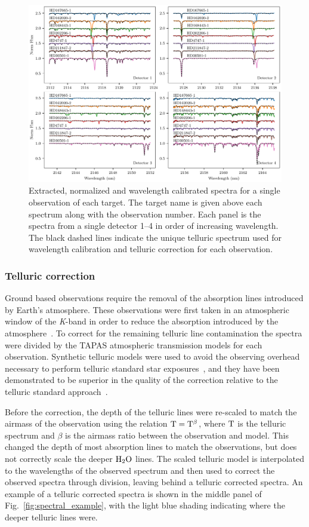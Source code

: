 \documentclass[fleqn,usenatbib]{mnras}
\begin{document}
\begin{figure}
    \includegraphics[width=0.8\hsize]{images/fig2.pdf}
    \caption{Extracted, normalized and wavelength calibrated spectra for a single observation of each target. The target name is given above each spectrum along with the observation number. Each panel is the spectra from a single detector 1--4 in order of increasing wavelength. The black dashed lines indicate the unique telluric spectrum used for wavelength calibration and telluric correction for each observation.}
    \label{fig:detector4allspectra}
\end{figure}

\subsubsection{Telluric correction}
\label{subsec:telluric_correction}
Ground based observations require the removal of the absorption lines introduced by Earth's atmosphere. These observations were first taken in an atmospheric window of the \textit{K}-band in order to reduce the absorption introduced by the atmosphere~\citep{barnes_hd_2008}. To correct for the remaining telluric line contamination the spectra were divided by the TAPAS\citep{bertaux_tapas_2014} atmospheric transmission models for each observation. Synthetic telluric models were used to avoid the observing overhead necessary to perform telluric standard star exposures~\citep{vacca_method_2003}, and they have been demonstrated to be superior in the quality of the correction relative to the telluric standard approach~\citep[e.g.][]{cotton_atmospheric_2014}.

Before the correction, the depth of the telluric lines were re-scaled to match the airmass of the observation using the relation \(\rm T = T^{\beta}\), where \(\rm T\) is the telluric spectrum and \(\beta\) is the airmass ratio between the observation and model. This changed the depth of most absorption lines to match the observations, but does not correctly scale the deeper \(\rm H_{2}O\) lines. The scaled telluric model is interpolated to the wavelengths of the observed spectrum and then used to correct the observed spectra through division, leaving behind a telluric corrected spectra. An example of a telluric corrected spectra is shown in the middle panel of Fig.~\ref{fig:spectral_example}, with the light blue shading indicating where the deeper telluric lines were.
\end{document}
